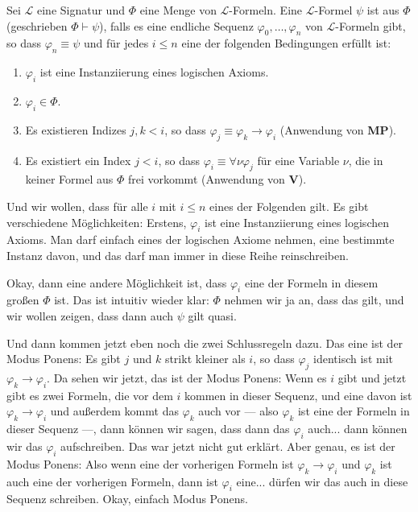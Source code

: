 \begin{math-stroke}
Sei $\mathcal{L}$ eine Signatur und $\Phi$ eine Menge von $\mathcal{L}$-Formeln.
Eine $\mathcal{L}$-Formel $\psi$ ist  aus $\Phi$ (geschrieben $\Phi \vdash \psi$), falls es eine endliche Sequenz $\varphi_0, \dots, \varphi_n$ von $\mathcal{L}$-Formeln gibt, so dass $\varphi_n \equiv \psi$ und für jedes $i \le n$ eine der folgenden Bedingungen erfüllt ist:
\begin{enumerate}[label=\textbf{(\arabic*)}]
    \item $\varphi_i$ ist eine Instanziierung eines logischen Axioms.
    \item $\varphi_i \in \Phi$.
    \item Es existieren Indizes $j, k < i$, so dass $\varphi_j \equiv \varphi_k \rightarrow \varphi_i$ (Anwendung von \textbf{MP}).
    \item Es existiert ein Index $j < i$, so dass $\varphi_i \equiv \forall \nu \varphi_j$ für eine Variable $\nu$, die in keiner Formel aus $\Phi$ frei vorkommt (Anwendung von \textbf{V}).
\end{enumerate}
\end{math-stroke}

\begin{spoken-clean}[00:20:15 - 00:22:30]
Und wir wollen, dass für alle $i$ mit $i \le n$ eines der Folgenden gilt. Es gibt verschiedene Möglichkeiten: Erstens, $\varphi_i$ ist eine Instanziierung eines logischen Axioms. Man darf einfach eines der logischen Axiome nehmen, eine bestimmte Instanz davon, und das darf man immer in diese Reihe reinschreiben.

Okay, dann eine andere Möglichkeit ist, dass $\varphi_i$ eine der Formeln in diesem großen $\Phi$ ist. Das ist intuitiv wieder klar: $\Phi$ nehmen wir ja an, dass das gilt, und wir wollen zeigen, dass dann auch $\psi$ gilt quasi.

Und dann kommen jetzt eben noch die zwei Schlussregeln dazu. Das eine ist der Modus Ponens: Es gibt $j$ und $k$ strikt kleiner als $i$, so dass $\varphi_j$ identisch ist mit $\varphi_k \rightarrow \varphi_i$. Da sehen wir jetzt, das ist der Modus Ponens: Wenn es $i$ gibt und jetzt gibt es zwei Formeln, die vor dem $i$ kommen in dieser Sequenz, und eine davon ist $\varphi_k \rightarrow \varphi_i$ und außerdem kommt das $\varphi_k$ auch vor --- also $\varphi_k$ ist eine der Formeln in dieser Sequenz ---, dann können wir sagen, dass dann das $\varphi_i$ auch... dann können wir das $\varphi_i$ aufschreiben. Das war jetzt nicht gut erklärt. Aber genau, es ist der Modus Ponens: Also wenn eine der vorherigen Formeln ist $\varphi_k \rightarrow \varphi_i$ und $\varphi_k$ ist auch eine der vorherigen Formeln, dann ist $\varphi_i$ eine... dürfen wir das auch in diese Sequenz schreiben. Okay, einfach Modus Ponens.
\end{spoken-clean}

